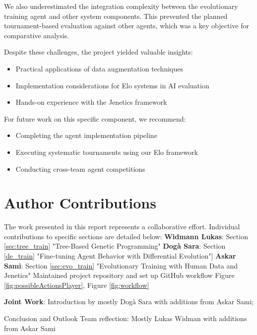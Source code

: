 \documentclass[sigconf]{acmart} %
\begin{document}
We also underestimated the integration complexity between the evolutionary training agent and other system components. This prevented the planned tournament-based evaluation against other agents, which was a key objective for comparative analysis.

Despite these challenges, the project yielded valuable insights:
\begin{itemize}
	\item Practical applications of data augmentation techniques
	\item Implementation considerations for Elo systems in AI evaluation
	\item Hands-on experience with the Jenetics framework
\end{itemize}

For future work on this specific component, we recommend:
\begin{itemize}
	\item Completing the agent implementation pipeline
	\item Executing systematic tournaments using our Elo framework
	\item Conducting cross-team agent competitions
\end{itemize}

\section{Author Contributions}
The work presented in this report represents a collaborative effort. Individual contributions to specific sections are detailed below:
\textbf{Widmann Lukas}: Section \ref{sec:tree_train} "Tree-Based Genetic Programming"
\newline \textbf{Dogà Sara}: Section \ref{de_train} "Fine-tuning Agent Behavior with Differential Evolution"] 
\newline \textbf{Askar Sami}: \newline
Section \ref{sec:evo_train} "Evolutionary Training with Human Data and Jenetics" 
\newline Maintained project repository and set up GitHub workflow \cite{rmb_github}
\newline Figure \ref{fig:possibleActionsPlayer}, Figure \ref{fig:workflow}

	 \textbf{Joint Work}: Introduction by mostly Dogà Sara with additions from Askar Sami;
	 
	  Conclusion and Outlook Team reflection: Mostly Lukas Widman with additions from Askar Sami




\end{document}
